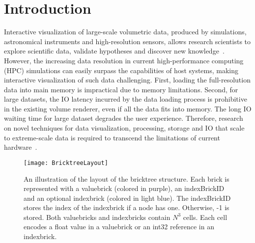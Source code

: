 


\maketitle

\section{Introduction}
\label{sec:introduction}
Interactive visualization of large-scale volumetric data, produced by
simulations, astronomical instruments and high-resolution sensors, 
allows research scientists to explore scientific data, validate
hypotheses and discover new knowledge~\cite{keim2013big}. 
However, the increasing data resolution in current high-performance
computing (HPC) simulations can easily surpass the capabilities of
host systems, making interactive visualization of such data challenging. 
First, loading the full-resolution data into main memory is impractical
due to memory limitations. Second, for large datasets, the IO latency incurred by the data 
loading process is prohibitive in the existing volume renderer,
even if all the data fits into memory.
The long IO waiting time for large dataset degrades the user experience.
Therefore, research on novel techniques for
data visualization, processing, storage and IO that scale to 
extreme-scale data is required to transcend the limitations
of current hardware~\cite{beyer2014survey}.

\begin{figure*}[h]
  \centering
    \texttt{[image: BricktreeLayout]}
	\caption{\label{fig:bricktree_layout}An illustration of the layout of the bricktree structure. Each brick is represented with a valuebrick (colored in purple), an indexBrickID and an optional indexbrick (colored in light blue). The indexBrickID stores the index of the indexbrick if a node has one. Otherwise, -1 is stored. Both valuebricks and indexbricks contain $N^3$ cells. 
Each cell encodes a float value in a valuebrick or an int32 reference in an indexbrick.}
\end{figure*}


